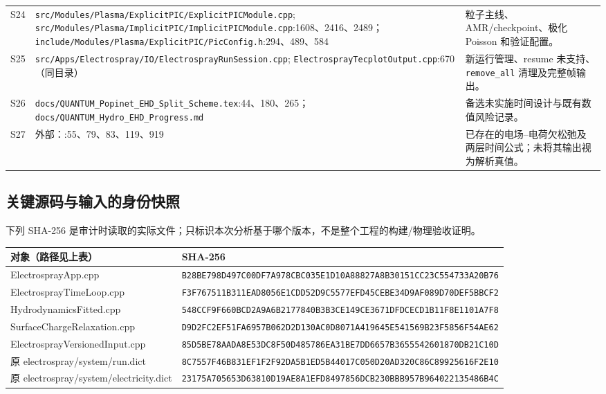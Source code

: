 \documentclass[UTF8,a4paper,11pt,fontset=fandol]{ctexart}
\numberwithin{equation}{section}
\newcommand{\code}[1]{\nolinkurl{#1}}
\begin{document}
\begin{longtable}{@{}P{.07\textwidth}P{.60\textwidth}P{.26\textwidth}@{}}
S24 & \code{src/Modules/Plasma/ExplicitPIC/ExplicitPICModule.cpp}; \code{src/Modules/Plasma/ImplicitPIC/ImplicitPICModule.cpp}:1608、2416、2489；\code{include/Modules/Plasma/ExplicitPIC/PicConfig.h}:294、489、584 & 粒子主线、AMR/checkpoint、极化 Poisson 和验证配置。\\
S25 & \code{src/Apps/Electrospray/IO/ElectrosprayRunSession.cpp}; \code{ElectrosprayTecplotOutput.cpp}:670（同目录） & 新运行管理、resume 未支持、\code{remove_all} 清理及完整帧输出。\\
S26 & \code{docs/QUANTUM_Popinet_EHD_Split_Scheme.tex}:44、180、265；\code{docs/QUANTUM_Hydro_EHD_Progress.md} & 备选未实施时间设计与既有数值风险记录。\\
S27 & 外部：:55、79、83、119、919 & 已存在的电场--电荷欠松弛及两层时间公式；未将其输出视为解析真值。\\
\bottomrule
\end{longtable}
\normalsize

\subsection{关键源码与输入的身份快照}
下列 SHA-256 是审计时读取的实际文件；只标识本次分析基于哪个版本，不是整个工程的构建/物理验收证明。
\small
\begin{longtable}{@{}P{.32\textwidth}P{.62\textwidth}@{}}
\toprule 对象（路径见上表） & SHA-256\\\midrule\endhead
ElectrosprayApp.cpp &
\code{B28BE798D497C00DF7A978CBC035E1D10A88827A8B30151CC23C554733A20B76}\\
ElectrosprayTimeLoop.cpp &
\code{F3F767511B311EAD8056E1CDD52D9C5577EFD45CEBE34D9AF089D70DEF5BBCF2}\\
HydrodynamicsFitted.cpp &
\code{548CCF9F660BCD2A9A6B2177840B3B3CE149CE3671DFDCECD1B11F8E1101A7F8}\\
SurfaceChargeRelaxation.cpp &
\code{D9D2FC2EF51FA6957B062D2D130AC0D8071A419645E541569B23F5856F54AE62}\\
ElectrosprayVersionedInput.cpp &
\code{85D5BE78AADA8E53DC8F50D485786EA31BE7DD6657B3655542601870DB21C10D}\\
原 electrospray/system/run.dict &
\code{8C7557F46B831EF1F2F92DA5B1ED5B44017C050D20AD320C86C89925616F2E10}\\
原 electrospray/system/electricity.dict &
\code{23175A705653D63810D19AE8A1EFD8497856DCB230BBB957B964022135486B4C}\\
\bottomrule
\end{longtable}
\normalsize
\end{document}
